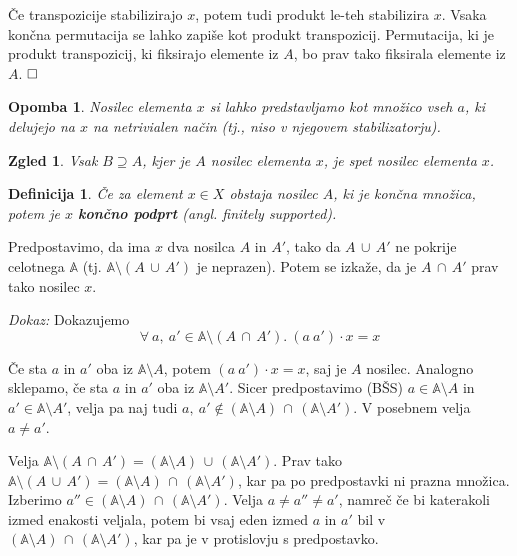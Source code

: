 \documentclass{article}
\def\qed{$\hfill\Box$}   %
\newtheorem{opomba}{Opomba}
\newtheorem{definicija}{Definicija}
\newtheorem{zgled}{Zgled}
\begin{document}
Če transpozicije stabilizirajo \(x\), potem tudi produkt le-teh stabilizira \(x\). Vsaka končna permutacija se lahko zapiše kot produkt transpozicij. Permutacija, ki je produkt transpozicij, ki fiksirajo elemente iz \(A\), bo prav tako fiksirala elemente iz \(A\).    \qed

\begin{opomba}
    Nosilec elementa \(x\) si lahko predstavljamo kot množico vseh \(a\), ki delujejo na \(x\) na netrivialen način (tj., niso v njegovem stabilizatorju).
\end{opomba}

\begin{zgled}
    Vsak \(B \supseteq A\), kjer je \(A\) nosilec elementa \(x\), je spet nosilec elementa \(x\).
\end{zgled}

\begin{definicija}
    Če za element \(x \in X\) obstaja nosilec \(A\), ki je končna množica, potem je \(x\) \textbf{končno podprt} (angl. \emph{finitely supported}).  %
\end{definicija}

Predpostavimo, da ima \(x\) dva nosilca \(A\) in \(A'\), tako da \(A\, \cup\, A'\) ne pokrije celotnega \(\mathds{A}\) (tj. \(\mathds{A} \setminus (A\, \cup\, A')\) je neprazen). Potem se izkaže, da je \(A\, \cap\, A'\) prav tako nosilec \(x\).

\noindent
{\em Dokaz:\/}
Dokazujemo
    \[
        \forall\ a,\ a' \in \mathds{A}\setminus (A\, \cap\, A').\ (a\ a') \cdot x = x
    \]

Če sta \(a\) in \(a'\) oba iz \(\mathds{A}\setminus A\), potem \((a \ a') \cdot x = x\), saj je \(A\) nosilec. Analogno sklepamo, če sta \(a\) in \(a'\) oba iz \(\mathds{A}\setminus A'\).  %
Sicer predpostavimo (BŠS) \(a \in \mathds{A}\setminus A\) in \(a' \in \mathds{A}\setminus A'\), velja pa naj tudi \(a,\ a' \notin (\mathds{A} \setminus A)\, \cap\, (\mathds{A} \setminus A')\). V posebnem velja \(a \neq a'\).

Velja \(\mathds{A}\setminus (A\, \cap\, A') = (\mathds{A} \setminus A)\, \cup\, (\mathds{A} \setminus A')\).
Prav tako \(\mathds{A} \setminus (A\, \cup\, A') = (\mathds{A} \setminus A)\, \cap\, (\mathds{A} \setminus A') \), kar pa po predpostavki ni prazna množica.
Izberimo \(a'' \in (\mathds{A} \setminus A)\, \cap\, (\mathds{A} \setminus A')\).
Velja \(a \neq a'' \neq a'\), namreč če bi katerakoli izmed enakosti veljala, potem bi vsaj eden izmed \(a\) in \(a'\) bil v \((\mathds{A} \setminus A)\, \cap\, (\mathds{A} \setminus A')\), kar pa je v protislovju s predpostavko.
\end{document}

